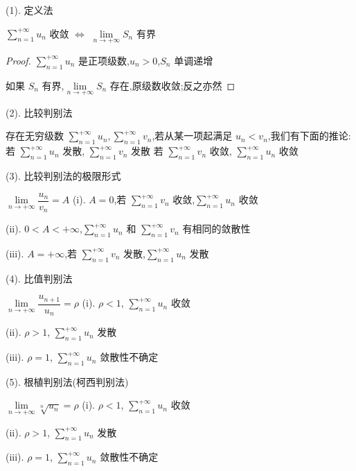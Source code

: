 (1). 定义法\label{定义法}
\begin{theorem}[收敛原则]\label{the: 正向级数敛散性的判别方法}
	$\sum\limits_{n=1}^{+\infty}u_{n}$ 收敛 $\Leftrightarrow$ $\lim\limits_{n\rightarrow +\infty}S_{n}$ 有界
\end{theorem}
\begin{proof}
	$\sum\limits_{n=1}^{+\infty}u_{n}$ 是正项级数,$u_{n}>0$,$S_{n}$ 单调递增

	如果 $S_{n}$ 有界,$\lim\limits_{n\rightarrow+\infty}S_{n}$ 存在,原级数收敛;反之亦然
\end{proof}
(2). 比较判别法
\begin{theorem}
	存在无穷级数 $\sum\limits_{n=1}^{+\infty}u_{n},\sum\limits_{n=1}^{+\infty}v_{n}$,若从某一项起满足 $u_{n}<v_{n}$,我们有下面的推论:
	若 $\sum\limits_{n=1}^{+\infty}u_{n}$ 发散, $\sum\limits_{n=1}^{+\infty}v_{n}$ 发散
	若 $\sum\limits_{n=1}^{+\infty}v_{n}$ 收敛, $\sum\limits_{n=1}^{+\infty}u_{n}$ 收敛
\end{theorem}
(3). 比较判别法的极限形式
\begin{theorem}\label{the: 比较判别法的极限形式}
	$\lim\limits_{n\rightarrow+\infty}\dfrac{u_{n}}{v_{n}}=A$
	(i). $A=0$,若 $\sum\limits_{n=1}^{+\infty}v_{n}$ 收敛,$\sum\limits_{n=1}^{+\infty}u_{n}$ 收敛

	(ii). $0<A<+\infty$,$\sum\limits_{n=1}^{+\infty}u_{n}$ 和 $\sum\limits_{n=1}^{+\infty}v_{n}$ 有相同的敛散性

	(iii). $A=+\infty$,若 $\sum\limits_{n=1}^{+\infty}v_{n}$ 发散,$\sum\limits_{n=1}^{+\infty}u_{n}$ 发散
\end{theorem}
(4). 比值判别法
\begin{theorem}
	$\lim\limits_{n\rightarrow+\infty}\dfrac{u_{n+1}}{u_{n}}=\rho$
	(i). $\rho<1$, $\sum\limits_{n=1}^{+\infty}u_{n}$ 收敛

	(ii). $\rho>1$, $\sum\limits_{n=1}^{+\infty}u_{n}$ 发散

	(iii). $\rho=1$, $\sum\limits_{n=1}^{+\infty}u_{n}$ 敛散性不确定
\end{theorem}
(5). 根植判别法(柯西判别法)
\begin{theorem}
	$\lim\limits_{n\rightarrow+\infty}\sqrt[n]{u_{n}}=\rho$
	(i). $\rho<1$, $\sum\limits_{n=1}^{+\infty}u_{n}$ 收敛

	(ii). $\rho>1$, $\sum\limits_{n=1}^{+\infty}u_{n}$ 发散

	(iii). $\rho=1$, $\sum\limits_{n=1}^{+\infty}u_{n}$ 敛散性不确定
\end{theorem}

